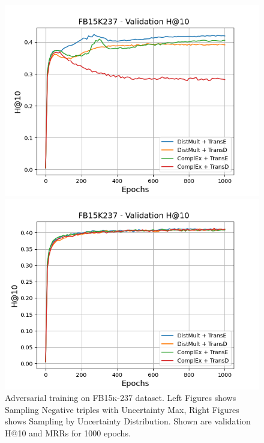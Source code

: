 \begin{figure}
\begin{minipage}{.5\textwidth}
    \end{minipage}
    \begin{minipage}{.5\textwidth}
      \centering
      \includegraphics[width=0.9\linewidth]{figures/results/gan_train/not_pretrained/uncertainty/max/entropy/fb15k237/1k_epochs/uncertainty_fb15k237_hit10.png}
    \end{minipage}%
    \begin{minipage}{.5\textwidth}
      \centering
      \includegraphics[width=0.9\linewidth]{figures/results/gan_train/not_pretrained/uncertainty/max_distribution/entropy/fb15k237/1k_epochs/uncertainty_fb15k237_hit10.png}
    \end{minipage}%
    \caption{Adversarial training on \textsc{FB15k-237} dataset. 
    Left Figures shows Sampling Negative triples with Uncertainty Max, Right Figures shows Sampling by Uncertainty Distribution.
    Shown are validation H@10 and MRRs for 1000 epochs.}
    \label{fig:advtrain_fb15k237_usmax_ussoftmax}
\end{figure}
